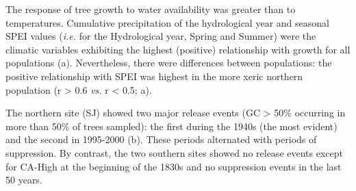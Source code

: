The response of tree growth to water availability was greater than to temperatures. Cumulative precipitation of the hydrological year and seasonal SPEI values (\emph{i.e.} for the Hydrological year, Spring and Summer) were the climatic variables exhibiting the highest (positive) relationship with growth for all populations (a). Nevertheless, there were differences between populations: the positive relationship with SPEI was highest in the more xeric northern population (r \textgreater{} 0.6 \emph{vs.} r \textless{} 0.5; a).

The northern site (SJ) showed two major release events (GC \textgreater{} 50\% occurring in more than 50\% of trees sampled): the first during the 1940s (the most evident) and the second in 1995-2000 (b). These periods alternated with periods of suppression. By contrast, the two southern sites showed no release events except for CA-High at the beginning of the 1830s and no suppression events in the last 50 years.

